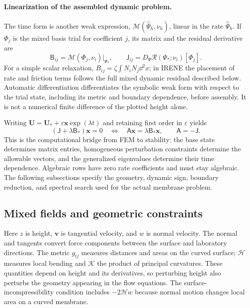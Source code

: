 \paragraph{Linearization of the assembled dynamic problem.}
The time form is another weak expression, $\mathcal M(\widehat\Psi_h,\nu_h)$, linear in the rate $\widehat\Psi_h$. If $\Phi_j$ is the mixed basis trial for coefficient $j$, its matrix and the residual derivative are
\begin{equation}
\mathsf B_{ij}=\mathcal M(\Phi_j,\nu_i)\big|_{\Psi_*},\qquad
\mathsf J_{ij}=D_\Psi\mathcal R(\Psi_*;\nu_i)[\Phi_j].
\label{eq:fem-matrices}
\end{equation}
For a simple scalar relaxation, $B_{ij}=\zeta\int N_iN_j\dd^2x$; in IRENE the placement of rate and friction terms follows the full mixed dynamic residual described below. Automatic differentiation differentiates the symbolic weak form with respect to the trial state, including its metric and boundary dependence, before assembly. It is not a numerical finite difference of the plotted height alone.

Writing $\bm U=\bm U_*+\varepsilon\bm x\exp(\lambda t)$ and retaining first order in $\varepsilon$ yields
\begin{equation}
(\mathsf J+\lambda\mathsf B_*)\bm x=0
\quad\Longleftrightarrow\quad
\mathsf A\bm x=\lambda\mathsf B_*\bm x,\qquad \mathsf A=-\mathsf J.
\end{equation}
This is the computational bridge from FEM to stability: the base state determines matrix entries, homogeneous perturbation constraints determine the allowable vectors, and the generalized eigenvalues determine their time dependence. Algebraic rows have zero rate coefficients and must stay algebraic. The following subsections specify the geometry, dynamic sign, boundary reduction, and spectral search used for the actual membrane problem.

\subsection{Mixed fields and geometric constraints}


Here $z$ is height, $\bm v$ is tangential velocity, and $w$ is normal velocity. The normal and tangents convert force components between the surface and laboratory directions. The metric $g_{ij}$ measures distances and areas on the curved surface; $\mathcal H$ measures local bending and $\mathcal K$ the product of principal curvatures. These quantities depend on height and its derivatives, so perturbing height also perturbs the geometry appearing in the flow equations. The surface-incompressibility condition includes $-2\mathcal H w$ because normal motion changes local area on a curved membrane.


